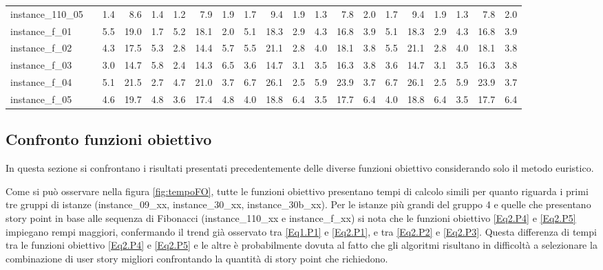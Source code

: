 \documentclass[12pt,a4paper,openright,twoside]{book}
\begin{document}
\begin{table}[H]
{\begin{tabular}{|ll|rrrrrr|rrrrrr|rrrrrr|}
instance\_110\_05             &     &    1.4  &   8.6  &  1.4  &   1.2  &   7.9  &  1.9  &      1.7  &   9.4  &  1.9  &   1.3  &   7.8  &  2.0  &       1.7  &   9.4  &  1.9  &   1.3  &   7.8  &  2.0   \\    
instance\_f\_01               &     &   5.5  &   19.0  &  1.7  &   5.2  &   18.1  &  2.0  &    5.1  &   18.3  &  2.9  &   4.3  &   16.8  &  3.9  &     5.1  &   18.3  &  2.9  &   4.3  &   16.8  &  3.9   \\   
instance\_f\_02               &     &    4.3  &   17.5  &  5.3  &   2.8  &   14.4  &  5.7  &    5.5  &   21.1  &  2.8  &   4.0  &   18.1  &  3.8  &     5.5  &   21.1  &  2.8  &   4.0  &   18.1  &  3.8   \\         
instance\_f\_03               &     &   3.0  &   14.7  &  5.8  &   2.4  &   14.3  &  6.5  &    3.6  &   14.7  &  3.1  &   3.5  &   16.3  &  3.8  &     3.6  &   14.7  &  3.1  &   3.5  &   16.3  &  3.8   \\    
instance\_f\_04               &     &    5.1  &   21.5  &  2.7  &   4.7  &   21.0  &  3.7  &    6.7  &   26.1  &  2.5  &   5.9  &   23.9  &  3.7  &     6.7  &   26.1  &  2.5  &   5.9  &   23.9  &  3.7   \\        
instance\_f\_05               &     &   4.6  &   19.7  &  4.8  &   3.6  &   17.4  &  4.8  &    4.0  &   18.8  &  6.4  &   3.5  &   17.7  &  6.4  &     4.0  &   18.8  &  6.4  &   3.5  &   17.7  &  6.4   \\   
 \hline
\end{tabular}
}
\end{table}

\subsection{Confronto funzioni obiettivo}

In questa sezione si confrontano i risultati presentati precedentemente delle diverse funzioni obiettivo considerando solo il metodo euristico.

Come si può osservare nella figura \ref{fig:tempoFO}, tutte le funzioni obiettivo presentano tempi di calcolo simili per quanto riguarda i primi tre gruppi di istanze (instance\_09\_xx, instance\_30\_xx, instance\_30b\_xx). Per le istanze più grandi del gruppo 4 e quelle che presentano story point in base alle sequenza di Fibonacci (instance\_110\_xx e instance\_f\_xx) si nota che le funzioni obiettivo \eqref{Eq2.P4} e \eqref{Eq2.P5} impiegano rempi maggiori, confermando il trend già osservato tra \eqref{Eq1.P1} e \eqref{Eq2.P1}, e tra \eqref{Eq2.P2} e \eqref{Eq2.P3}.
Questa differenza di tempi tra le funzioni obiettivo \eqref{Eq2.P4} e \eqref{Eq2.P5} e le altre \`e probabilmente dovuta al fatto che gli algoritmi risultano in difficoltà a selezionare la combinazione di user story migliori confrontando la quantità di story point che richiedono.
\end{document}
